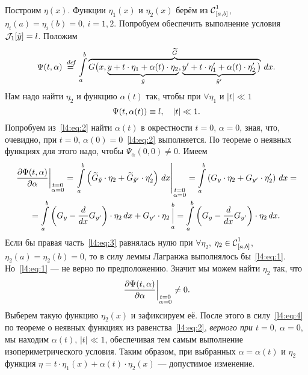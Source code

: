 Построим $\eta(x)$. Функции $\eta_1(x)$ и $\eta_2(x)$ берём из $\Cfn[{[a,b]}]{1}$, $\eta_i(a)=\eta_i(b)=0$, $i=1,2$. Попробуем обеспечить выполнение условия $\J_1[\tilde{y}]=l$. Положим
\begin{equation*}
	\hfill\Psi(t,\alpha)\eqdef\int\limits_a^b \overbrace{G\big(x,\underbrace{y+t\cdot\eta_1+\alpha(t)\cdot\eta_2}_{\tilde{y}},\underbrace{y'+t\cdot\eta'_1+\alpha(t)\cdot\eta'_2}_{\tilde{y}'}\big)}^{\widetilde{G}}\,dx.\hfill
\end{equation*}
Нам надо найти $\eta_2$ и функцию $\alpha(t)$ так, чтобы при $\forall\eta_1$ и $|t|\ll1$
\begin{equation}
	\label{l4:eq:2}
	\hfill\Psi(t,\alpha(t))\equiv l,\quad|t|\ll1.\hfill
\end{equation}
Попробуем из~\eqref{l4:eq:2} найти $\alpha(t)$ в окрестности $t=0$, $\alpha=0$, зная, что, очевидно, при $t=0$, ${\alpha(0)=0}$~\eqref{l4:eq:2} выполняется. По теореме о неявных функциях для этого надо, чтобы $\Psi_{\alpha}(0,0)\neq0$. Имеем
\begin{multline}
	\label{l4:eq:3}
	\left.\pder{\Psi(t,\alpha)}{\alpha}\right|_{\substack{t=0\\\alpha=0}}=\left.\int\limits_a^b\left(\widetilde{G}_{\tilde{y}}\cdot\eta_2+\widetilde{G}_{\tilde{y}'}\cdot\eta'_2\right)\,dx\right|_{\substack{t=0\\\alpha=0}}=\int\limits_a^b\left({G}_{{y}}\cdot\eta_2+{G}_{y'}\cdot\eta'_2\right)\,dx=\\
	=\int\limits_a^b\left(G_y-\der{}{x}G_{y'}\right)\cdot\eta_2\,dx+G_{y'}\cdot\eta_2\mathop{\Big|}\limits_a^b=\int\limits_a^b\left(G_y-\der{}{x}G_{y'}\right)\cdot\eta_2\,dx.
\end{multline}
Если бы правая часть~\eqref{l4:eq:3} равнялась нулю при $\forall\eta_2$, $\eta_2\in\Cfn[{[a,b]}]{1}$, $\eta_2(a)=\eta_2(b)=0$, то в силу леммы Лагранжа выполнялось бы~\eqref{l4:eq:1}. Но~\eqref{l4:eq:1} --- не верно по предположению. Значит мы можем найти $\eta_2$ так, что
\begin{equation}
	\label{l4:eq:4}
	\hfill\left.\pder{\Psi(t,\alpha)}{\alpha}\right|_{\substack{t=0\\\alpha=0}}\neq0.\hfill
\end{equation}
Выберем такую функцию $\eta_2(x)$ и зафиксируем её. После этого в силу~\eqref{l4:eq:4} по теореме о неявных функциях из равенства~\eqref{l4:eq:2}, \emph{верного при  $t=0$, $\alpha=0$}, мы находим $\alpha(t)$, $|t|\ll1$, обеспечивая тем самым выполнение изопериметрического условия. Таким образом, при выбранных $\alpha=\alpha(t)$ и $\eta_2$ функция $\eta=t\cdot\eta_1(x)+\alpha(t)\cdot\eta_2(x)$ --- допустимое изменение.

